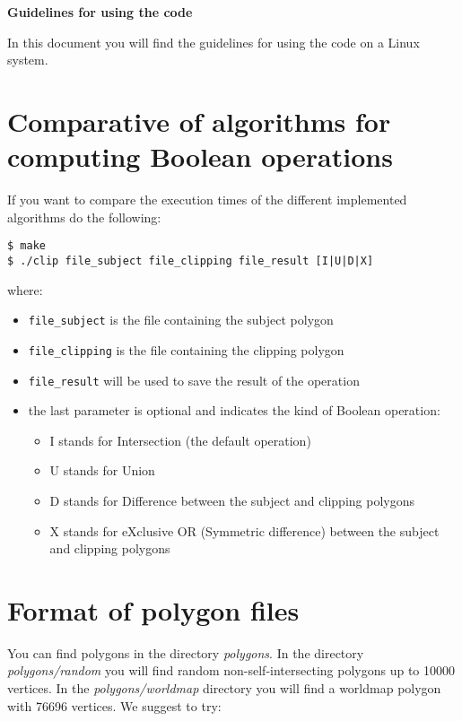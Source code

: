 \documentclass[a4paper]{article}
\begin{document}
\lstset{language=C++, basicstyle=\small, showstringspaces=false}

\begin{center}
\textbf{Guidelines for using the code}
\end{center}

\vspace{1cm}
\noindent In this document you will find the guidelines for using the code on a Linux system.

%
%
\section{Comparative of algorithms for computing Boolean operations}

If you want to compare the execution times of the different implemented algorithms do the following:

\begin{verbatim}
$ make
$ ./clip file_subject file_clipping file_result [I|U|D|X]
\end{verbatim}

\noindent where:

\begin{itemize}
 \item \verb+file_subject+ is the file containing the subject polygon
 \item \verb+file_clipping+ is the file containing the clipping polygon
 \item \verb+file_result+ will be used to save the result of the operation
 \item the last parameter is optional and indicates the kind of Boolean operation:
   \begin{itemize}
    \item I stands for Intersection (the default operation)
    \item U stands for Union
    \item D stands for Difference between the subject and clipping polygons
    \item X stands for eXclusive OR (Symmetric difference) between the subject and clipping polygons
   \end{itemize}
\end{itemize}

%
%
\section{Format of polygon files}
You can find polygons in the directory \textit{polygons}. In the directory \textit{polygons/random} you will find random non-self-intersecting polygons up to 10000 vertices. In the \textit{polygons/worldmap} directory you will 
find a worldmap polygon with 76696 vertices. We suggest to try:
\end{document}
